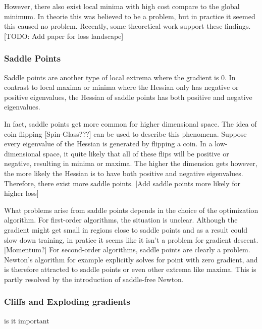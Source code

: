 However, there also exist local minima with high cost compare to the global
minimum. In theorie this was believed to be a problem, but in practice it seemed
this caused no problem. Recently, some theoretical work support these
findings. [TODO: Add paper for loss landscape]

\subsubsection{Saddle Points}\label{prob:3}
Saddle points are another type of local extrema where the gradient is 0. In
contrast to local maxima or minima where the Hessian only has negative or
positive eigenvalues, the Hessian of saddle points has both positive and
negative eigenvalues.

In fact, saddle points get more common for higher dimensional space. The idea of
coin flipping [Spin-Glass???] can be used to describe this phenomena. Suppose
every eigenvalue of the Hessian is generated by flipping a coin. In a
low-dimensional space, it quite likely that all of these flips will be positive
or negative, resulting in minima or maxima. The higher the dimension gets
however, the more likely the Hessian is to have both positive and negative
eigenvalues. Therefore, there exist more saddle points. [Add saddle points more
likely for higher loss]

What problems arise from saddle points depends in the choice of the optimization
algorithm. For first-order algorithms, the situation is unclear. Although the
gradient might get small in regions close to saddle points and as a result could
slow down training, in pratice it seems like it isn't a problem for gradient
descent. [Momentum?]
For second-order algorithms, saddle points are clearly a problem. Newton's
algorithm for example explicitly solves for point with zero gradient, and is
therefore attracted to saddle points or even other extrema like maxima. This is
partly resolved by the introduction of saddle-free Newton. 


\subsubsection{Cliffs and Exploding gradients}
is it important

